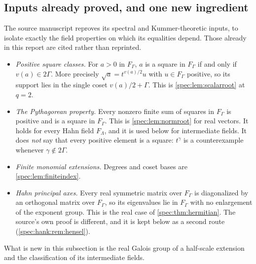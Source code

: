 \documentclass[11pt,a4paper]{article}
\numberwithin{equation}{section}
\theoremstyle{definition}
\theoremstyle{remark}
\begin{document}
\subsection{Inputs already proved, and one new ingredient}
\label{spec:hank:sub:inputs}

The source manuscript reproves its spectral and Kummer-theoretic inputs, to
isolate exactly the field properties on which its equalities depend. Those
already in this report are cited rather than reprinted.
\begin{itemize}
\item \emph{Positive square classes.} For $a>0$ in $F_\Gamma$, $a$ is a
square in $F_\Gamma$ if and only if $v(a)\in2\Gamma$. More precisely
$\sqrt a=t^{v(a)/2}u$ with $u\in F_\Gamma$ positive, so its support lies in
the single coset $v(a)/2+\Gamma$. This is \cref{spec:lem:scalarroot} at
$q=2$.
\item \emph{The Pythagorean property.} Every nonzero finite sum of squares
in $F_\Gamma$ is positive and is a square in $F_\Gamma$. This is
\cref{spec:lem:normroot} for real vectors. It holds for every Hahn field
$F_\Lambda$, and it is used below for intermediate fields. It does
\emph{not} say that every positive element is a square: $t^\gamma$ is a
counterexample whenever $\gamma\notin2\Gamma$.
\item \emph{Finite monomial extensions.} Degrees and coset bases are
\cref{spec:lem:finiteindex}.
\item \emph{Hahn principal axes.} Every real symmetric matrix over $F_\Gamma$
is diagonalized by an orthogonal matrix over $F_\Gamma$, so its eigenvalues
lie in $F_\Gamma$ with no enlargement of the exponent group. This is the real
case of \cref{spec:thm:hermitian}. The source's own proof is different, and
it is kept below as a second route (\cref{spec:hank:rem:hensel}).
\end{itemize}
What is new in this subsection is the real Galois group of a half-scale
extension and the classification of its intermediate fields.
\end{document}
